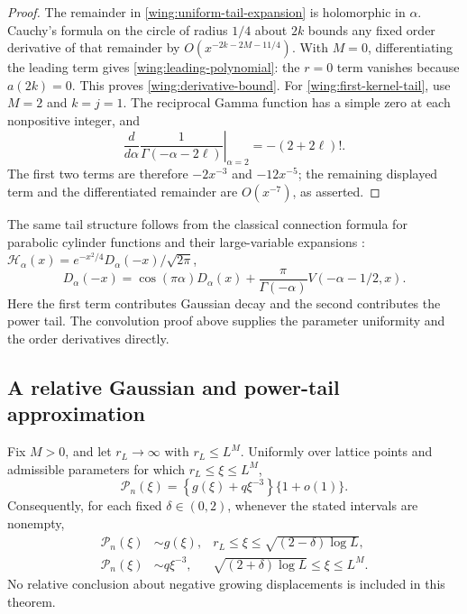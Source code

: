 \begin{proof}
The remainder in \eqref{wing:uniform-tail-expansion} is
holomorphic in $\alpha$.  Cauchy's formula on the circle of radius
$1/4$ about $2k$ bounds any fixed order derivative of that remainder
by $O(x^{-2k-2M-11/4})$.  With $M=0$, differentiating the leading
term gives \eqref{wing:leading-polynomial}: the $r=0$ term vanishes
because $a(2k)=0$.  This proves \eqref{wing:derivative-bound}.
For \eqref{wing:first-kernel-tail}, use $M=2$ and $k=j=1$.
The reciprocal Gamma function has a simple zero at each
nonpositive integer, and
\[
 \left.\frac{d}{d\alpha}\frac1{\Gamma(-\alpha-2\ell)}
                         \right|_{\alpha=2}
 =-(2+2\ell)!.
\]
The first two terms are therefore $-2x^{-3}$ and $-12x^{-5}$;
the remaining displayed term and the differentiated remainder are
$O(x^{-7})$, as asserted.
\end{proof}

The same tail structure follows from the classical connection formula
for parabolic cylinder functions and their large-variable expansions \cite{dlmf-cylinder}:
$\mathcal H_\alpha(x)=e^{-x^2/4}D_\alpha(-x)/\sqrt{2\pi}$,
\[
 D_\alpha(-x)=\cos(\pi\alpha)D_\alpha(x)
       +\frac{\pi}{\Gamma(-\alpha)}V(-\alpha-1/2,x).
\]
Here the first term contributes Gaussian decay and the second
contributes the power tail.  The convolution proof above supplies
the parameter uniformity and the order derivatives directly.

\subsection{A relative Gaussian and power-tail approximation}

\begin{theorem}
\label{thm:positive-windows}
Fix $M>0$, and let $r_L\to\infty$ with $r_L\le L^M$.
Uniformly over lattice points and admissible parameters for which
$r_L\le\xi\le L^M$,
\begin{equation}\label{wing:relative-mixture}
 \mathcal P_n(\xi)
 =\left\{g(\xi)+q\xi^{-3}\right\}\{1+o(1)\}.
\end{equation}
Consequently, for each fixed $\delta\in(0,2)$, whenever the stated
intervals are nonempty,
\begin{align}
 \mathcal P_n(\xi)&\sim g(\xi),
 &r_L\le\xi\le\sqrt{(2-\delta)\log L},
                       \label{wing:gaussian-window}\\
 \mathcal P_n(\xi)&\sim q\xi^{-3},
 &\sqrt{(2+\delta)\log L}\le\xi\le L^M.
                       \label{wing:power-window}
\end{align}
No relative conclusion about negative growing displacements is
included in this theorem.
\end{theorem}

